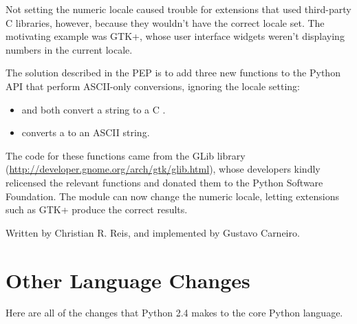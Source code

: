 \documentclass{howto}
\begin{document}
Not setting the numeric locale caused trouble for extensions that used
third-party C libraries, however, because they wouldn't have the
correct locale set.  The motivating example was GTK+, whose user
interface widgets weren't displaying numbers in the current locale.

The solution described in the PEP is to add three new functions to the
Python API that perform ASCII-only conversions, ignoring the locale
setting:

\begin{itemize}
 \item {} 
and  
both convert a string to a C .
 \item {} converts a  to an ASCII string.
\end{itemize}

The code for these functions came from the GLib library
(\url{http://developer.gnome.org/arch/gtk/glib.html}), whose
developers kindly relicensed the relevant functions and donated them
to the Python Software Foundation.  The  module 
can now change the numeric locale, letting extensions such as GTK+ 
produce the correct results.

\begin{seealso}
{Written by Christian R. Reis, and implemented by Gustavo Carneiro.}
\end{seealso}      

\section{Other Language Changes}

Here are all of the changes that Python 2.4 makes to the core Python
language.
\end{document}
